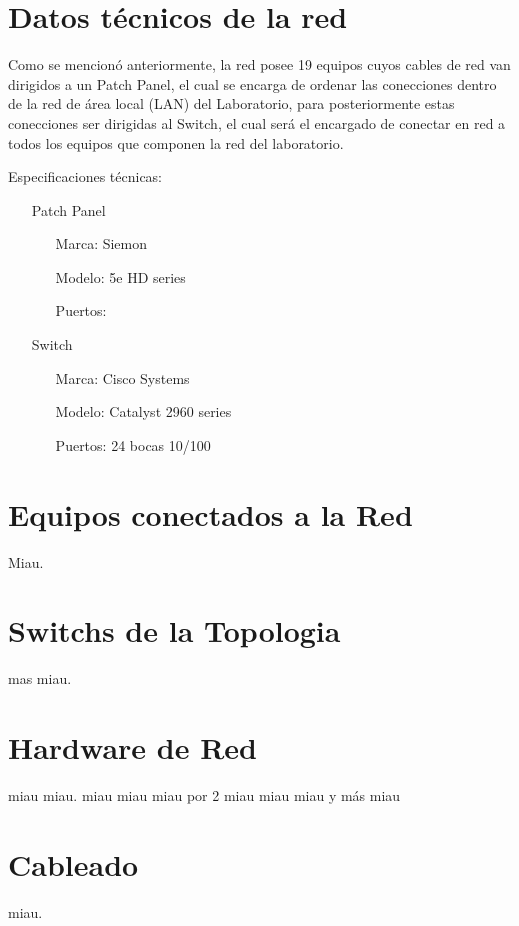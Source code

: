 \documentclass[spanish]{udpreport}
\begin{document}
\section {Datos técnicos de la red}
Como se mencionó anteriormente, la red posee 19 equipos cuyos cables de red van dirigidos a un Patch Panel, el cual se encarga de ordenar las conecciones dentro de la red de área local (LAN) del Laboratorio, para posteriormente estas conecciones ser dirigidas al Switch, el cual será el encargado de conectar en red a todos los equipos que componen la red del laboratorio.

Especificaciones técnicas:\\

 \begin{itemize}
    \item[Patch Panel]
    \begin{itemize}
         \item[Marca:] Siemon
         \item[Modelo:] 5e HD series
         \item[Puertos:]
    \end{itemize}
 \end{itemize}

 \begin{itemize}
    \item[Switch]
    \begin{itemize}
         \item[Marca:] Cisco Systems
         \item[Modelo:] Catalyst 2960 series
         \item[Puertos:] 24 bocas 10/100
    \end{itemize}
 \end{itemize}


\section{Equipos conectados a la Red}
Miau.

\section{Switchs de la Topologia}
mas miau.

\section{Hardware de Red}
miau miau.
miau miau miau por 2
miau miau miau y más miau
\section{Cableado}
miau.
\end{document}
